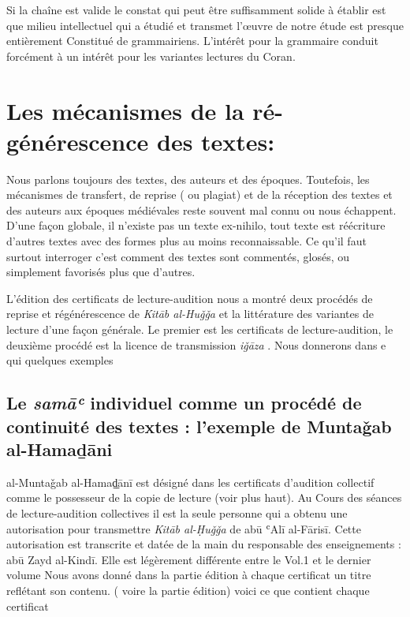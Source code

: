 \documentclass[a4paper,12pt]{report}
\begin{document}
Si la chaîne est valide  le constat qui peut être suffisamment solide à établir est que  milieu intellectuel qui a étudié et transmet l'œuvre de notre étude  est presque entièrement Constitué de  grammairiens. L'intérêt pour la grammaire conduit forcément à un intérêt pour les variantes lectures  du Coran.     

\section{Les mécanismes de la ré-générescence des textes:  }

Nous parlons toujours des textes, des auteurs et des époques. Toutefois, les mécanismes de transfert, de reprise ( ou plagiat)  et de la réception des textes et des auteurs aux époques médiévales reste  souvent mal connu ou nous échappent. D'une façon globale, il n'existe pas un texte ex-nihilo,  tout  texte est réécriture d'autres textes avec des formes plus au moins reconnaissable. Ce qu'il faut surtout interroger c'est comment des textes sont  commentés, glosés, ou  simplement favorisés plus que d'autres. 

L'édition des certificats de lecture-audition nous a montré deux procédés de reprise et régénérescence  de \textit{Kitāb al-Huǧǧa} et la littérature des variantes de lecture d'une façon générale. Le premier est les certificats de lecture-audition, le deuxième procédé est la licence de transmission \textit{iǧāza }. Nous donnerons dans e qui quelques exemples

\subsection{    Le \textit{samāʿ} individuel comme un procédé de   continuité des textes : l'exemple de   Muntaǧab al-Hamaḏāni }

al-Muntaǧab al-Hamaḏ̠ān\=i est    
désigné dans les certificats d'audition collectif comme le possesseur de la copie de lecture (voir plus haut). Au Cours des séances de lecture-audition collectives  il est la seule personne qui a obtenu une autorisation pour transmettre \textit{ Kitāb al-Ḥuǧǧa }de abū ʿAlī al-Fārisī. Cette autorisation est transcrite et datée de la main du responsable des enseignements : abū Zayd al-Kind\=i. Elle est légèrement différente entre le Vol.1 et le dernier volume  Nous avons donné dans la partie édition à chaque certificat  un titre reflétant son contenu. ( voire la partie édition) voici ce que contient chaque certificat 
\end{document}
